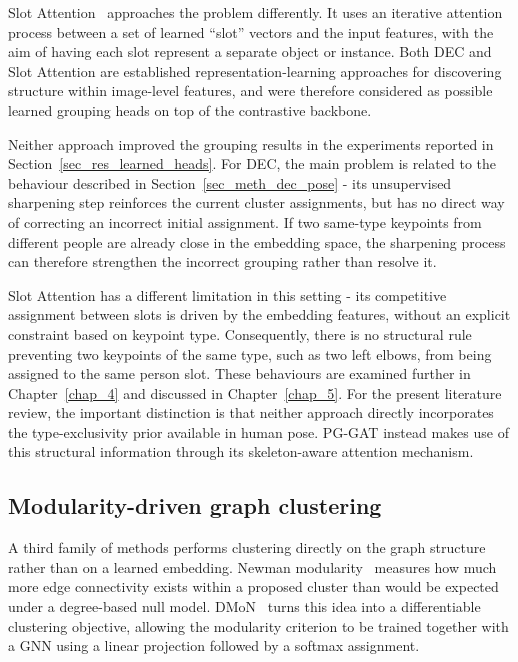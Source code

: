 Slot Attention~\cite{locatello2020slotattention} approaches the problem differently.
It uses an iterative attention process between a set of learned ``slot'' vectors and the input features,
with the aim of having each slot represent a separate object or instance.
Both DEC and Slot Attention are established representation-learning approaches
for discovering structure within image-level features,
and were therefore considered as possible learned grouping heads on top of the contrastive backbone.

Neither approach improved the grouping results in the experiments reported in Section~\ref{sec_res_learned_heads}.
For DEC, the main problem is related to the behaviour described in Section~\ref{sec_meth_dec_pose} -
its unsupervised sharpening step reinforces the current cluster assignments,
but has no direct way of correcting an incorrect initial assignment.
If two same-type keypoints from different people are already close in the embedding space,
the sharpening process can therefore strengthen the incorrect grouping rather than resolve it.

Slot Attention has a different limitation in this setting -
its competitive assignment between slots is driven by the embedding features,
without an explicit constraint based on keypoint type.
Consequently, there is no structural rule preventing two keypoints of the same type,
such as two left elbows, from being assigned to the same person slot.
These behaviours are examined further in Chapter~\ref{chap_4} and discussed in Chapter~\ref{chap_5}.
For the present literature review,
the important distinction is that neither approach directly incorporates
the type-exclusivity prior available in human pose.
PG-GAT instead makes use of this structural information through its skeleton-aware attention mechanism.

\subsection{Modularity-driven graph clustering}
\label{sec_lit_rep_learn_modularity}

A third family of methods performs clustering directly on the graph structure rather than on a learned embedding.
Newman modularity~\cite{newman2006modularity} measures
how much more edge connectivity exists within a proposed cluster
than would be expected under a degree-based null model.
DMoN~\cite{tsitsulin2023dmon} turns this idea into a differentiable clustering objective,
allowing the modularity criterion to be trained together with a GNN
using a linear projection followed by a softmax assignment.

